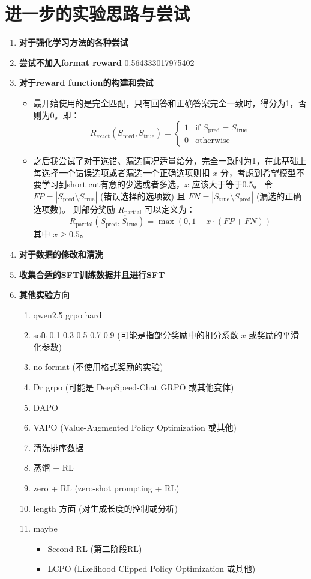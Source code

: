 \documentclass{pkuthesis}
\begin{document}
\section{进一步的实验思路与尝试}
\begin{enumerate}[label=\arabic*.]
    \item \textbf{对于强化学习方法的各种尝试}
    \item \textbf{尝试不加入format reward}
    0.564333017975402
    \item \textbf{对于reward function的构建和尝试}
    \begin{itemize}
        \item 最开始使用的是完全匹配，只有回答和正确答案完全一致时，得分为1，否则为0。即：
        $$ R_{\text{exact}}(S_{\text{pred}}, S_{\text{true}}) = \begin{cases} 1 & \text{if } S_{\text{pred}} = S_{\text{true}} \\ 0 & \text{otherwise} \end{cases} $$
        \item 之后我尝试了对于选错、漏选情况适量给分，完全一致时为1，在此基础上每选择一个错误选项或者漏选一个正确选项则扣 $x$ 分，考虑到希望模型不要学习到short cut有意的少选或者多选，$x$ 应该大于等于0.5。
        令 $FP = |S_{\text{pred}} \setminus S_{\text{true}}|$ (错误选择的选项数) 且 $FN = |S_{\text{true}} \setminus S_{\text{pred}}|$ (漏选的正确选项数)。
        则部分奖励 $R_{\text{partial}}$ 可以定义为：
        $$ R_{\text{partial}}(S_{\text{pred}}, S_{\text{true}}) = \max(0, 1 - x \cdot (FP + FN)) $$
        其中 $x \ge 0.5$。
    \end{itemize}
    \item \textbf{对于数据的修改和清洗}
    \item \textbf{收集合适的SFT训练数据并且进行SFT}
    \item \textbf{其他实验方向}
    \begin{enumerate}[label=\arabic*.]
        \item qwen2.5 grpo hard
        \item soft 0.1 0.3 0.5 0.7 0.9 (可能是指部分奖励中的扣分系数 $x$ 或奖励的平滑化参数)
        \item no format (不使用格式奖励的实验)
        \item Dr grpo (可能是 DeepSpeed-Chat GRPO 或其他变体)
        \item DAPO
        \item VAPO (Value-Augmented Policy Optimization 或其他)
        \item 清洗排序数据
        \item 蒸馏 + RL
        \item zero + RL (zero-shot prompting + RL)
        \item length 方面 (对生成长度的控制或分析)
        \item maybe
        \begin{itemize}
            \item Second RL (第二阶段RL)
            \item LCPO (Likelihood Clipped Policy Optimization 或其他)
        \end{itemize}
    \end{enumerate}
\end{enumerate}

\printbibliography
\end{document}
